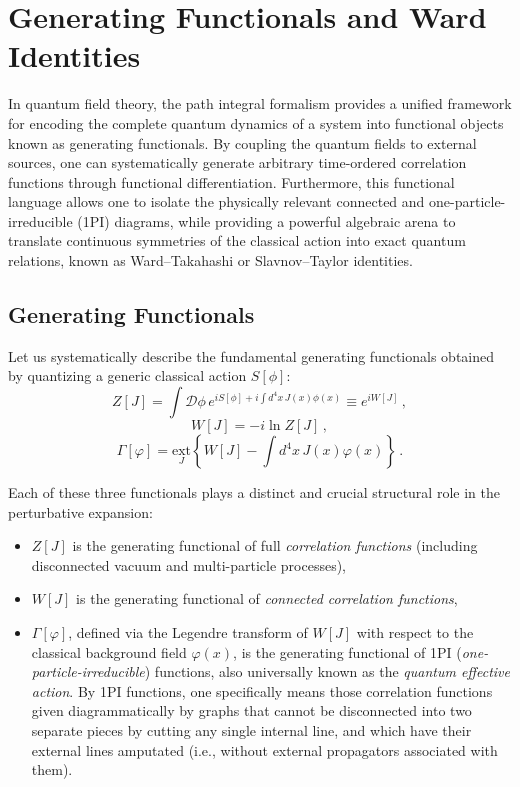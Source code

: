 \chapter{Generating Functionals and Ward Identities}

In quantum field theory, the path integral formalism provides a unified framework for encoding the complete quantum dynamics of a system into functional objects known as generating functionals. By coupling the quantum fields to external sources, one can systematically generate arbitrary time-ordered correlation functions through functional differentiation. Furthermore, this functional language allows one to isolate the physically relevant connected and one-particle-irreducible (1PI) diagrams, while providing a powerful algebraic arena to translate continuous symmetries of the classical action into exact quantum relations, known as Ward--Takahashi or Slavnov--Taylor identities.

\section{Generating Functionals}

Let us systematically describe the fundamental generating functionals obtained by quantizing a generic classical action \(S[\phi]\):
\begin{equation} \label{eq:partition_function_Z}
    Z[J] = \int \mathcal{D}\phi \, e^{iS[\phi] + i \int d^4x \, J(x)\phi(x)} \equiv e^{iW[J]} \, ,
\end{equation}
\begin{equation} \label{eq:connected_generator_W}
    W[J] = -i \ln Z[J] \, ,
\end{equation}
\begin{equation} \label{eq:effective_action_Gamma}
    \Gamma[\varphi] = \underset{J}{\text{ext}} \left\{ W[J] - \int d^4x \, J(x)\varphi(x) \right\} \, .
\end{equation}

Each of these three functionals plays a distinct and crucial structural role in the perturbative expansion:
\begin{itemize}
    \item \(Z[J]\) is the generating functional of full \textit{correlation functions} (including disconnected vacuum and multi-particle processes),
    \item \(W[J]\) is the generating functional of \textit{connected correlation functions},
    \item \(\Gamma[\varphi]\), defined via the Legendre transform of \(W[J]\) with respect to the classical background field \(\varphi(x)\), is the generating functional of 1PI (\textit{one-particle-irreducible}) functions, also universally known as the \textit{quantum effective action}. By 1PI functions, one specifically means those correlation functions given diagrammatically by graphs that cannot be disconnected into two separate pieces by cutting any single internal line, and which have their external lines amputated (i.e., without external propagators associated with them).
\end{itemize}

